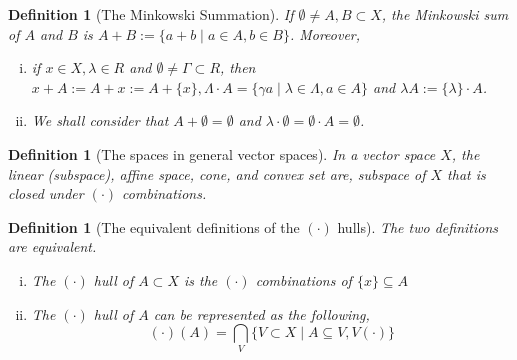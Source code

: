 \documentclass{beamerswitch}
\newcommand{\conv}{\mathbf{conv}}
\newtheorem{defn}[thm]{Definition}
\newtheorem{lem}[thm]{Lemma}
\begin{document}
\begin{defn}[The Minkowski Summation]
    If \(\emptyset \neq A, B \subset X\), the Minkowski sum of \(A\) and \(B\) is \(A+B:=\{ a+ b \mid a \in A, b \in B\}\). Moreover,
    \begin{enumerate}[(i)]
        \item if $x \in X, \lambda \in R$ and $\emptyset \neq \Gamma \subset R$, then $x+A:=A+x:=A+\{x\}, \Lambda \cdot A=\{\gamma a \mid \lambda \in \Lambda, a \in A\}$ and $\lambda A:=\{\lambda\} \cdot A$.
        \item We shall consider that $A+\emptyset=\emptyset$ and $\lambda \cdot \emptyset=\emptyset \cdot A=\emptyset$.
    \end{enumerate}
\end{defn}
\begin{defn}[The spaces in general vector spaces]
    In a vector space \(X\), the linear (subspace), affine space, cone, and convex set are,
    subspace of \(X\) that is closed under \((\cdot)\) combinations.
\end{defn}
\begin{defn}[The equivalent definitions of the \((\cdot)\) hulls]
    The two definitions are equivalent.
    \begin{enumerate}[(i)]
        \item The \((\cdot)\) hull of \(A \subset X\) is the \((\cdot)\) combinations of \(\{x\} \subseteq A\)
        \item The \((\cdot)\) hull of \(A\) can be represented as the following,
              \begin{equation}
                  (\cdot) (A) = \bigcap_V\{V \subset X \mid A \subseteq V, V (\cdot)\}
              \end{equation}
    \end{enumerate}
\end{defn}
\end{document}
